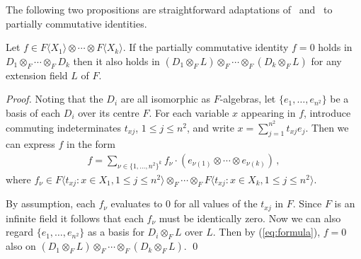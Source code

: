 \documentclass[runningheads]{llncs}
\begin{document}
The following two propositions are straightforward adaptations
of~\cite[Proposition 7.5.5.]{Cohn03} and~\cite[Proposition
  7.7.2]{Cohn03} to partially commutative identities.
\begin{proposition}
Let $f \in F\langle X_1\rangle \otimes \cdots \otimes F\langle
X_k\rangle$.  If the partially commutative identity $f=0$ holds in
$D_1 \otimes_F \cdots \otimes_F D_k$ then it also holds in $(D_1
\otimes_F L) \otimes_F \cdots \otimes_F (D_k \otimes_F L)$ for any
extension field $L$ of $F$.
\label{prop:extend}
\end{proposition}
\begin{proof}
Noting that the $D_i$ are all isomorphic as $F$-algebras, let
$\{e_1,\ldots,e_{n^2}\}$ be a basis of each $D_i$ over its centre $F$.
For each variable $x$ appearing in $f$, introduce commuting
indeterminates $t_{xj}$, $1 \leq j \leq n^2$, and write
$x=\sum_{j=1}^{n^2} t_{xj}e_j$.  Then we can express $f$ in the form
\begin{gather} f = \sum_{\nu \in \{1,\ldots,n^2\}^{k}} f_\nu \cdot 
(e_{\nu(1)} \otimes \cdots \otimes e_{\nu(k)}) \, , 
\label{eq:formula}
\end{gather}
where $f_\nu \in 
F \langle t_{xj} : x\in X_1,1 \leq j\leq n^2 \rangle
\otimes_F \cdots \otimes_F F 
\langle t_{xj} : x\in X_k,1 \leq j\leq n^2 \rangle$.

By assumption, each $f_\nu$ evaluates to $0$ for all values of the
$t_{xj}$ in $F$.  Since $F$ is an infinite field it follows that each
$f_\nu$ must be identically zero.  Now we can also regard
$\{e_1,\ldots,e_{n^2}\}$ as a basis for $D_i \otimes_F L$ over $L$.
Then by (\ref{eq:formula}), $f=0$ also on $(D_1 \otimes_F L) \otimes_F
\cdots \otimes_F (D_k \otimes_F L)$.  \qed
\end{proof}
\end{document}
